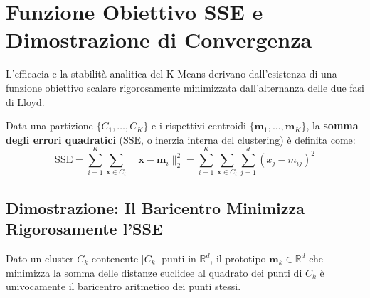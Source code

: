 \section{Funzione Obiettivo SSE e Dimostrazione di Convergenza}
\label{sec:dm-kmeans-sse-convergence}

L'efficacia e la stabilità analitica del K-Means derivano dall'esistenza di una funzione obiettivo scalare rigorosamente minimizzata dall'alternanza delle due fasi di Lloyd.

\begin{definition}
Data una partizione $\{C_1, \dots, C_K\}$ e i rispettivi centroidi $\{\mathbf{m}_1, \dots, \mathbf{m}_K\}$, la \textbf{somma degli errori quadratici} ($\mathrm{SSE}$, o inerzia interna del clustering) è definita come:
\begin{equation}
    \mathrm{SSE} = \sum_{i=1}^K \sum_{\mathbf{x} \in C_i} \|\mathbf{x} - \mathbf{m}_i\|_2^2 = \sum_{i=1}^K \sum_{\mathbf{x} \in C_i} \sum_{j=1}^d (x_j - m_{ij})^2
    \label{eq:dm-sse-definition}
\end{equation}
\end{definition}

\subsection{Dimostrazione: Il Baricentro Minimizza Rigorosamente l'SSE}

\begin{theorem}
Dato un cluster $C_k$ contenente $|C_k|$ punti in $\mathbb{R}^d$, il prototipo $\mathbf{m}_k \in \mathbb{R}^d$ che minimizza la somma delle distanze euclidee al quadrato dei punti di $C_k$ è univocamente il baricentro aritmetico dei punti stessi.
\end{theorem}

